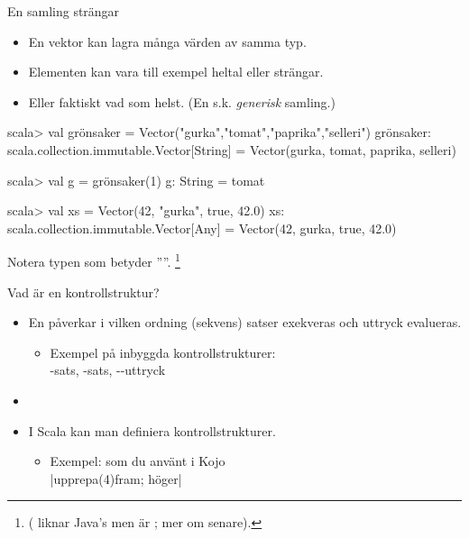 \begin{Slide}{En samling strängar}

\begin{itemize}
\item En vektor kan lagra många värden av samma typ.
\item Elementen kan vara till exempel heltal eller strängar.
\item Eller faktiskt vad som helst. (En s.k. \emph{generisk} samling.)
\end{itemize}

\begin{REPL}
scala> val grönsaker = Vector("gurka","tomat","paprika","selleri")
grönsaker: scala.collection.immutable.Vector[String] =
  Vector(gurka, tomat, paprika, selleri)

scala> val g = grönsaker(1)
g: String = tomat

scala> val xs = Vector(42, "gurka", true, 42.0)
xs: scala.collection.immutable.Vector[Any] = Vector(42, gurka, true, 42.0)
\end{REPL}
Notera typen  som betyder ''''. \footnote{( liknar Java's  men är ; mer om  senare).}
\end{Slide}





\begin{Slide}{Vad är en kontrollstruktur?}
\begin{itemize}
\item En  påverkar i vilken ordning (sekvens) satser exekveras och uttryck evalueras.
\begin{itemize}
\item[] Exempel på inbyggda kontrollstrukturer:
\\\vspace{0.5em}-sats, -sats, --uttryck
\end{itemize}

\item[]

\item I Scala kan man definiera  kontrollstrukturer.
\begin{itemize}
\item[] Exempel:  som du använt i Kojo
\\\vspace{0.5em}\code|upprepa(4){fram; höger}|
\end{itemize}
\end{itemize}
\end{Slide}

